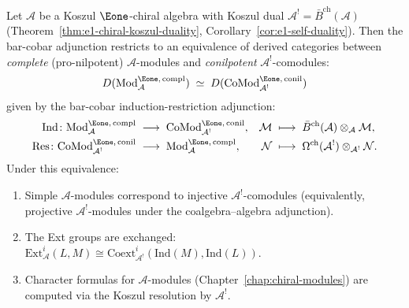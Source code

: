 \begin{theorem}
\label{thm:e1-module-koszul-duality}
Let $\mathcal{A}$ be a Koszul $\Eone$-chiral algebra with Koszul
dual $\mathcal{A}^! = \bar{B}^{\mathrm{ch}}(\mathcal{A})$
(Theorem~\ref{thm:e1-chiral-koszul-duality},
Corollary~\ref{cor:e1-self-duality}).  Then the bar-cobar adjunction
restricts to an equivalence of derived categories between
\emph{complete} (pro-nilpotent) $\mathcal{A}$-modules and
\emph{conilpotent} $\mathcal{A}^!$-comodules:
\[
D(\mathrm{Mod}^{\Eone,\,\mathrm{compl}}_{\mathcal{A}})
\;\simeq\;
D(\mathrm{CoMod}^{\Eone,\,\mathrm{conil}}_{\mathcal{A}^!})
\]
given by the bar-cobar induction-restriction adjunction:
\begin{align*}
\mathrm{Ind}\colon \mathrm{Mod}^{\Eone,\,\mathrm{compl}}_{\mathcal{A}}
&\;\longrightarrow\;
\mathrm{CoMod}^{\Eone,\,\mathrm{conil}}_{\mathcal{A}^!}, &
\mathcal{M} &\;\longmapsto\;
\bar{B}^{\mathrm{ch}}(\mathcal{A}) \otimes_{\mathcal{A}} \mathcal{M},
\\
\mathrm{Res}\colon \mathrm{CoMod}^{\Eone,\,\mathrm{conil}}_{\mathcal{A}^!}
&\;\longrightarrow\;
\mathrm{Mod}^{\Eone,\,\mathrm{compl}}_{\mathcal{A}}, &
\mathcal{N} &\;\longmapsto\;
\Omega^{\mathrm{ch}}(\mathcal{A}^!) \otimes_{\mathcal{A}^!}
\mathcal{N}.
\end{align*}
Under this equivalence:
\begin{enumerate}[label=\textup{(\roman*)}]
\item Simple $\mathcal{A}$-modules correspond to injective
   $\mathcal{A}^!$-comodules (equivalently, projective
   $\mathcal{A}^!$-modules under the coalgebra--algebra adjunction).
\item The Ext groups are exchanged:
   $\mathrm{Ext}^i_{\mathcal{A}}(L, M) \cong
   \mathrm{Coext}^i_{\mathcal{A}^!}(\mathrm{Ind}(M), \mathrm{Ind}(L))$.
\item Character formulas for $\mathcal{A}$-modules
   (Chapter~\ref{chap:chiral-modules}) are computed via the Koszul
   resolution by $\mathcal{A}^!$.
\end{enumerate}
\end{theorem}

